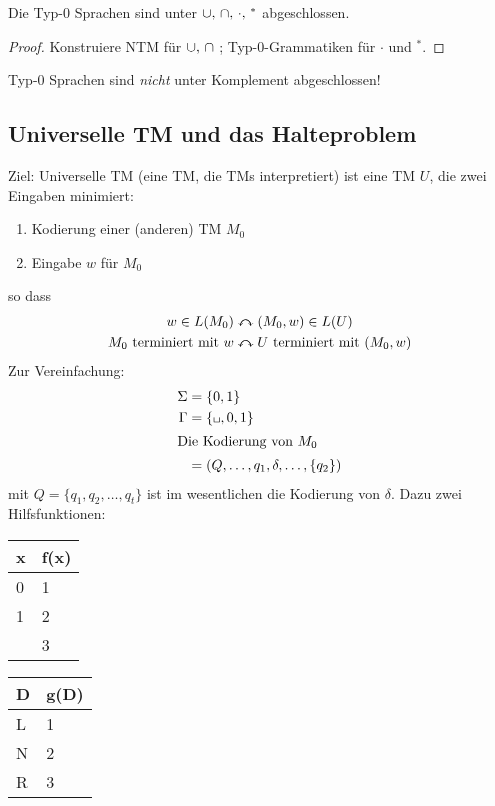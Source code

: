 \begin{Satz}[name={[Abgeschlossenheit von Typ-0 Sprachen]}]\label{satz:Typ-0-abgeschl}
	Die Typ-0 Sprachen sind unter $\thinmuskip=6mu\cup,\cap,\cdot,{}^*$ abgeschlossen.
\end{Satz}
\begin{proof}
	Konstruiere \ac{NTM} für $\thinmuskip=6mu\cup,\cap$ ; Typ-0-Grammatiken für $\cdot$ und $^*$.
\end{proof}

\begin{Bem}
	Typ-0 Sprachen sind \emph{nicht} unter Komplement abgeschlossen!
\end{Bem}

\subsection{Universelle \acs*{TM} und das Halteproblem}
Ziel: Universelle \ac{TM} (eine \ac{TM}, die \ac{TM}s interpretiert) ist eine \ac{TM} $U$, die zwei Eingaben minimiert:
\begin{enumerate}
\item Kodierung einer (anderen) \ac{TM} $M_0$
\item Eingabe $w$ für $M_0$
\end{enumerate}
so dass
\begin{align*}
	w\in L(M_0) &\curvearrowleftright (M_0,w) \in L(U)\\
	\text{$M_0$ terminiert mit $w$} &\curvearrowleftright \text{$U$ terminiert mit $(M_0,w)$}
\end{align*}
Zur Vereinfachung:
\begin{align*}
	\Sigma &= \{0,1\}\\
	\Gamma &=\{\blank,0,1\}\\
\shortintertext{Die Kodierung von $M_0$}
	&= (Q,\dots,q_1,\delta,\dots,\{q_2\})
\end{align*}
mit $Q=\{q_1,q_2,\dots,q_t\}$ ist im wesentlichen die Kodierung von $\delta$. Dazu zwei Hilfsfunktionen:
\begin{tabular}{M{c} | M{c}}
	x\in\Gamma & f(x) \\           & 1    \\
	1          & 2    \\
	\blank     & 3    \\
\end{tabular}
\quad
\begin{tabular}{M{c} | M{c}}
	D & g(D) \\
\hline
	L & 1    \\
	N & 2    \\
	R & 3
\end{tabular}

